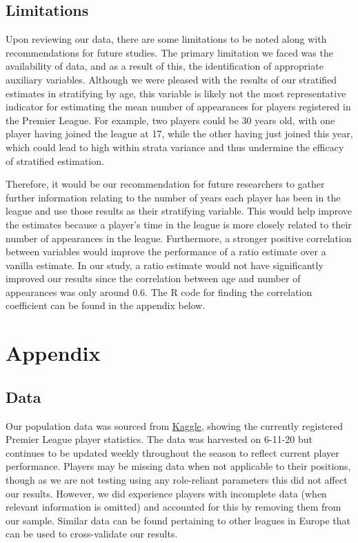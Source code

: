 \documentclass[paper=a4, fontsize=12pt,twoside]{article}	%
\begin{document}
\subsection{Limitations}
Upon reviewing our data, there are some limitations to be noted along with recommendations for future studies. The primary limitation we faced was the availability of data, and as a result of this, the identification of appropriate auxiliary variables. Although we were pleased with the results of our stratified estimates in stratifying by age, this variable is likely not the most representative indicator for estimating the mean number of appearances for players registered in the Premier League. For example, two players could be 30 years old, with one player having joined the league at 17, while the other having just joined this year, which could lead to high within strata variance and thus undermine the efficacy of stratified estimation. 

\vspace{2mm}
\noindent Therefore, it would be our recommendation for future researchers to gather further information relating to the number of years each player has been in the league and use those results as their stratifying variable. This would help improve the estimates because a player’s time in the league is more closely related to their number of appearances in the league. Furthermore, a stronger positive correlation between variables would improve the performance of a ratio estimate over a vanilla estimate. In our study, a ratio estimate would not have significantly improved our results since the correlation between age and number of appearances was only around 0.6. The R code for finding the correlation coefficient can be found in the appendix below.

\vspace{2mm}


\clearpage
\section{Appendix}
\subsection{Data}
Our population data was sourced from \href{https://www.kaggle.com/rishikeshkanabar/premier-league-player-statistics-updated-daily}{Kaggle}, showing the currently registered Premier League player statistics. The data was harvested on 6-11-20 but continues to be updated weekly throughout the season to reflect current player performance. Players may be missing data when not applicable to their positions, though as we are not testing using any role-reliant parameters this did not affect our results. However, we did experience players with incomplete data (when relevant information is omitted) and accounted for this by removing them from our sample. Similar data can be found pertaining to other leagues in Europe that can be used to cross-validate our results. 
\end{document}
